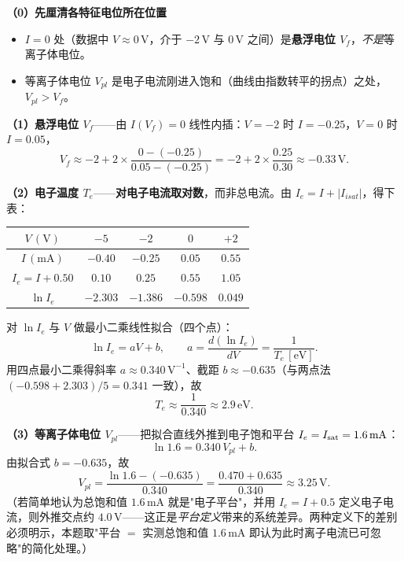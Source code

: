 \textbf{（0）先厘清各特征电位所在位置}
\begin{itemize}
    \item $I=0$ 处（数据中 $V\approx0\,\mathrm{V}$，介于 $-2\,\mathrm{V}$ 与 $0\,\mathrm{V}$ 之间）是\textbf{悬浮电位 $V_f$}，\emph{不是}等离子体电位。
    \item 等离子体电位 $V_{pl}$ 是电子电流刚进入饱和（曲线由指数转平的拐点）之处，$V_{pl} > V_f$。
\end{itemize}

\textbf{（1）悬浮电位 $V_f$}——由 $I(V_f)=0$ 线性内插：$V=-2$ 时 $I=-0.25$，$V=0$ 时 $I=0.05$，
\[
    V_f \approx -2 + 2\times\frac{0-(-0.25)}{0.05-(-0.25)} = -2 + 2\times\frac{0.25}{0.30} \approx -0.33\,\mathrm{V}.
\]

\textbf{（2）电子温度 $T_e$}——\textbf{对电子电流取对数}，而非总电流。由 $I_e = I + |I_{isat}|$，得下表：
\begin{center}
\begin{tabular}{c|cccc}
$V\,(\mathrm{V})$ & $-5$ & $-2$ & $0$ & $+2$ \\
\hline
$I\,(\mathrm{mA})$ & $-0.40$ & $-0.25$ & $0.05$ & $0.55$ \\
$I_e = I+0.50$ & $0.10$ & $0.25$ & $0.55$ & $1.05$ \\
$\ln I_e$ & $-2.303$ & $-1.386$ & $-0.598$ & $0.049$ \\
\end{tabular}
\end{center}
对 $\ln I_e$ 与 $V$ 做最小二乘线性拟合（四个点）：
\begin{equation}
    \ln I_e = aV + b,\qquad
    a = \frac{d(\ln I_e)}{dV} = \frac{1}{T_e\,[\mathrm{eV}]}.
\end{equation}
用四点最小二乘得斜率 $a\approx0.340\,\mathrm{V^{-1}}$、截距 $b\approx-0.635$（与两点法 $(-0.598+2.303)/5=0.341$ 一致），故
\[
    \boxed{T_e \approx \frac{1}{0.340} \approx 2.9\,\mathrm{eV}}.
\]

\textbf{（3）等离子体电位 $V_{pl}$}——把拟合直线外推到电子饱和平台 $I_e = I_{\rm sat} = 1.6\,\mathrm{mA}$：
\[
    \ln 1.6 = 0.340\,V_{pl} + b.
\]
由拟合式 $b = -0.635$，故
\[
    V_{pl} = \frac{\ln 1.6 - (-0.635)}{0.340} = \frac{0.470+0.635}{0.340} \approx 3.25\,\mathrm{V}.
\]
（若简单地认为总饱和值 $1.6\,\mathrm{mA}$ 就是"电子平台"，并用 $I_e = I + 0.5$ 定义电子电流，则外推交点约 $4.0\,\mathrm{V}$——这正是\emph{平台定义}带来的系统差异。两种定义下的差别必须明示，本题取"平台 $=$ 实测总饱和值 $1.6\,\mathrm{mA}$ 即认为此时离子电流已可忽略"的简化处理。）

